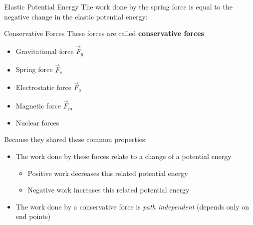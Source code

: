\documentclass[12pt,compress,aspectratio=169]{beamer}
\begin{document}
\begin{frame}{Elastic Potential Energy}
  The work done by the spring force is equal to the negative change in the
  elastic potential energy:
  

\end{frame}



\begin{frame}{Conservative Forces}
  These forces are called \textbf{conservative forces}
  \begin{itemize}
  \item Gravitational force $\vec F_g$
  \item Spring force $\vec F_s$
  \item Electrostatic force $\vec F_q$
  \item Magnetic force $\vec F_m$
  \item Nuclear forces
  \end{itemize}
  Because they shared these common properties:
  \begin{itemize}
  \item The work done by these forces relate to a change of a potential energy
    \begin{itemize}
    \item Positive work decreases this related potential energy
    \item Negative work increases this related potential energy
    \end{itemize}
  \item The work done by a conservative force is \emph{path independent}
    (depends only on end points)
  \end{itemize}
\end{frame}
\end{document}
